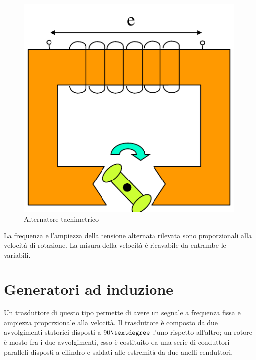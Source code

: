 \begin{figure}[htbp]
	\centering
	\includegraphics[scale=0.5]
			{img/alternatoretachi.png}
	\caption{Alternatore tachimetrico\label{fig:altachi}}
\end{figure}


La frequenza e l'ampiezza della tensione alternata rilevata sono
proporzionali alla velocità di rotazione. La misura della velocità è
ricavabile da entrambe le variabili.


\section{Generatori ad induzione}
Un trasduttore di questo tipo permette di avere un segnale a
frequenza fissa e ampiezza proporzionale alla velocità. Il
trasduttore è composto da due avvolgimenti statorici disposti a
$90\textdegree$ l'uno rispetto all'altro; un rotore è mosto fra i due
avvolgimenti, esso è costituito da una serie di conduttori paralleli
disposti a cilindro e saldati alle estremità da due anelli conduttori.

